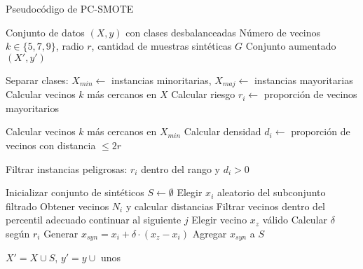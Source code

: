 \begin{algorithm}[H]
\caption{Pseudocódigo de PC-SMOTE}
\begin{algorithmic}[1]
\Require Conjunto de datos $(X, y)$ con clases desbalanceadas
\Require Número de vecinos $k \in \{5, 7, 9\}$, radio $r$, cantidad de muestras sintéticas $G$
\Ensure Conjunto aumentado $(X', y')$

\State Separar clases: $X_{min} \gets$ instancias minoritarias, $X_{maj} \gets$ instancias mayoritarias
    \State Calcular vecinos $k$ más cercanos en $X$
    \State Calcular riesgo $r_i \gets$ proporción de vecinos mayoritarios
\EndFor

    \State Calcular vecinos $k$ más cercanos en $X_{min}$
    \State Calcular densidad $d_i \gets$ proporción de vecinos con distancia $\leq 2r$
\EndFor

\State Filtrar instancias peligrosas: $r_i$ dentro del rango y $d_i > 0$

\State Inicializar conjunto de sintéticos $S \gets \emptyset$
    \State Elegir $x_i$ aleatorio del subconjunto filtrado
    \State Obtener vecinos $N_i$ y calcular distancias
    \State Filtrar vecinos dentro del percentil adecuado
        \State continuar al siguiente $j$
    \EndIf
    \State Elegir vecino $x_z$ válido
    \State Calcular $\delta$ según $r_i$
    \State Generar $x_{syn} = x_i + \delta \cdot (x_z - x_i)$
    \State Agregar $x_{syn}$ a $S$
\EndFor

\State \Return $X' = X \cup S$, $y' = y \cup$ unos
\end{algorithmic}
\end{algorithm}


